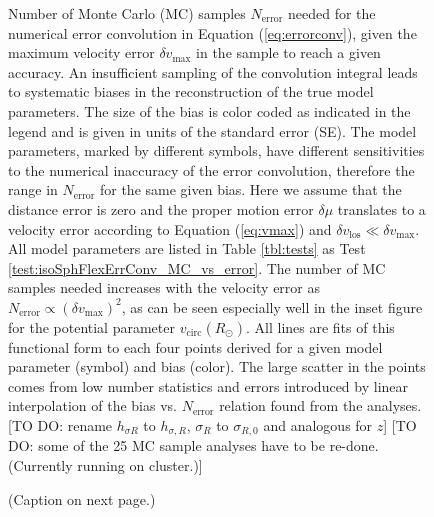 
\begin{figure}
\caption{Number of Monte Carlo (MC) samples $N_\text{error}$ needed for the numerical error convolution in Equation (\ref{eq:errorconv}), given the maximum velocity error $\delta v_\text{max}$ in the sample to reach a given accuracy.  An insufficient sampling of the convolution integral leads to systematic biases in the reconstruction of the true model parameters. The size of the bias is color coded as indicated in the legend and is given in units of the standard error (SE).  The model parameters, marked by different symbols, have different sensitivities to the numerical inaccuracy of the error convolution, therefore the range in $N_\text{error}$ for the same given bias. Here we assume that the distance error is zero and the proper motion error $\delta \mu$ translates to a velocity error according to Equation (\ref{eq:vmax}) and $\delta v_\text{los} \ll \delta v_\text{max}$. All model parameters are listed in Table \ref{tbl:tests} as Test \ref{test:isoSphFlexErrConv_MC_vs_error}. The number of MC samples needed increases with the velocity error as $N_\text{error} \propto \left( \delta v_\text{max} \right)^2$, as can be seen especially well in the inset figure for the potential parameter $v_\text{circ}(R_\odot)$. All lines are fits of this functional form to each four points derived for a given model parameter (symbol) and bias (color). The large scatter in the points comes from low number statistics and errors introduced by linear interpolation of the bias vs. $N_\text{error}$ relation found from the analyses. [TO DO: rename $h_{\sigma R}$ to $h_{\sigma,R}$, $\sigma_R$ to $\sigma_{R,0}$ and analogous for $z$] [TO DO: some of the 25 MC sample analyses have to be re-done. (Currently running on cluster.)]}
\label{fig:isoSphFlexErrConv_MC_vs_error}
\end{figure}



\begin{figure}
\caption{(Caption on next page.)}
\end{figure}

